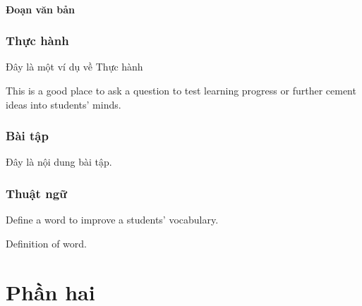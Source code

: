 \documentclass[12pt,fleqn]{book} %
\begin{document}
\subsection{Đoạn văn bản}

\begin{example}[Tên ví dụ]
\lipsum[2]
\end{example}


\section{Thực hành}

Đây là một ví dụ về Thực hành

\begin{exercise}
This is a good place to ask a question to test learning progress or further cement ideas into students' minds.
\end{exercise}


\section{Bài tập}

\begin{problem}
Đây là nội dung bài tập.
\end{problem}


\section{Thuật ngữ}

Define a word to improve a students' vocabulary.

\begin{vocabulary}[Word]
Definition of word.
\end{vocabulary}


\part{Phần hai}
\end{document}
